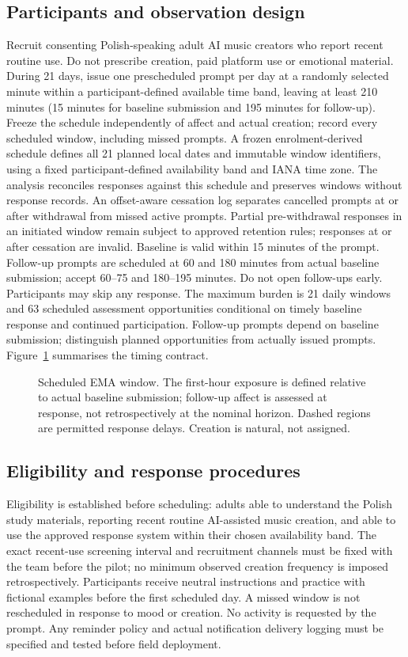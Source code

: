 \documentclass[11pt]{article}
\begin{document}
\subsection{Participants and observation design}
Recruit consenting Polish-speaking adult AI music creators who report recent routine use. Do not prescribe creation, paid platform use or emotional material. During 21 days, issue one prescheduled prompt per day at a randomly selected minute within a participant-defined available time band, leaving at least 210 minutes (15 minutes for baseline submission and 195 minutes for follow-up). Freeze the schedule independently of affect and actual creation; record every scheduled window, including missed prompts. A frozen enrolment-derived schedule defines all 21 planned local dates and immutable window identifiers, using a fixed participant-defined availability band and IANA time zone. The analysis reconciles responses against this schedule and preserves windows without response records. An offset-aware cessation log separates cancelled prompts at or after withdrawal from missed active prompts. Partial pre-withdrawal responses in an initiated window remain subject to approved retention rules; responses at or after cessation are invalid. Baseline is valid within 15 minutes of the prompt. Follow-up prompts are scheduled at 60 and 180 minutes from actual baseline submission; accept 60--75 and 180--195 minutes. Do not open follow-ups early. Participants may skip any response. The maximum burden is 21 daily windows and 63 scheduled assessment opportunities conditional on timely baseline response and continued participation. Follow-up prompts depend on baseline submission; distinguish planned opportunities from actually issued prompts. Figure~\ref{fig:ema-window} summarises the timing contract.

\begin{figure}[htbp]
\centering

\caption{Scheduled EMA window. The first-hour exposure is defined relative to actual baseline submission; follow-up affect is assessed at response, not retrospectively at the nominal horizon. Dashed regions are permitted response delays. Creation is natural, not assigned.}
\label{fig:ema-window}
\end{figure}

\subsection{Eligibility and response procedures}
Eligibility is established before scheduling: adults able to understand the Polish study materials, reporting recent routine AI-assisted music creation, and able to use the approved response system within their chosen availability band. The exact recent-use screening interval and recruitment channels must be fixed with the team before the pilot; no minimum observed creation frequency is imposed retrospectively. Participants receive neutral instructions and practice with fictional examples before the first scheduled day. A missed window is not rescheduled in response to mood or creation. No activity is requested by the prompt. Any reminder policy and actual notification delivery logging must be specified and tested before field deployment.
\end{document}
